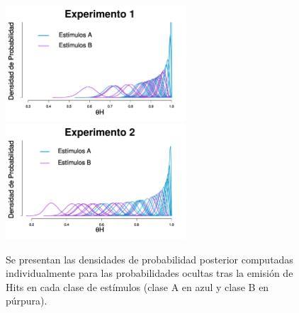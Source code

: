 \begin{figure}[th]
\centering
\includegraphics[width=0.6\textwidth]{Figures/MTau_Hits_E1}\\
\includegraphics[width=0.6\textwidth]{Figures/MTau_Hits_E2}\\
\caption[Modelo Tau: Inferencias individuales para el valor de la probabilidad de cometer un Hit en cada clase de estímulos]{Se presentan las densidades de probabilidad posterior computadas individualmente para las probabilidades ocultas tras la emisión de Hits en cada clase de estímulos (clase A en azul y clase B en púrpura).}
\label{fig:Tau_Hits}
\end{figure}

